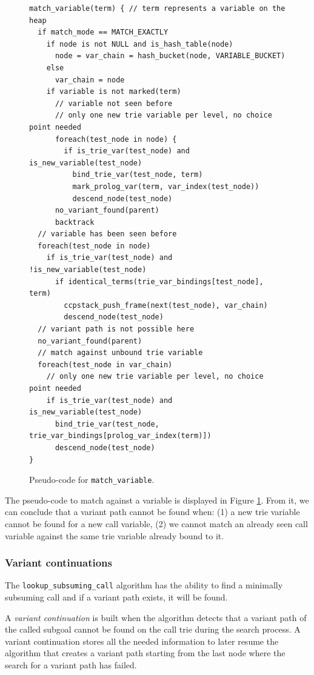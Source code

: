 \begin{figure}[ht]
\begin{Verbatim}[fontsize=\small]
match_variable(term) { // term represents a variable on the heap
  if match_mode == MATCH_EXACTLY
    if node is not NULL and is_hash_table(node)
      node = var_chain = hash_bucket(node, VARIABLE_BUCKET)
    else
      var_chain = node
    if variable is not marked(term)
      // variable not seen before
      // only one new trie variable per level, no choice point needed
      foreach(test_node in node) {
        if is_trie_var(test_node) and is_new_variable(test_node)
          bind_trie_var(test_node, term)
          mark_prolog_var(term, var_index(test_node))
          descend_node(test_node)
      no_variant_found(parent)
      backtrack
  // variable has been seen before
  foreach(test_node in node)
    if is_trie_var(test_node) and !is_new_variable(test_node)
      if identical_terms(trie_var_bindings[test_node], term)
        ccpstack_push_frame(next(test_node), var_chain)
        descend_node(test_node)
  // variant path is not possible here
  no_variant_found(parent)
  // match against unbound trie variable
  foreach(test_node in var_chain)
    // only one new trie variable per level, no choice point needed
    if is_trie_var(test_node) and is_new_variable(test_node)
      bind_trie_var(test_node, trie_var_bindings[prolog_var_index(term)])
      descend_node(test_node)
}
\end{Verbatim}
\caption{Pseudo-code for \texttt{match\_variable}.}
\label{fig:match_variable}
\end{figure}

The pseudo-code to match against a variable is displayed in Figure
\ref{fig:match_variable}. From it, we can conclude that a variant path
cannot be found when: (1) a new trie variable cannot be found
for a new call variable, (2) we cannot match an already seen
call variable against the same trie variable already bound to it.

\subsubsection{Variant continuations}

The \texttt{lookup\_subsuming\_call} algorithm has the ability to find a
minimally subsuming call and if a variant path exists, it will be found.

A \textit{variant continuation} is built when the algorithm detects that a variant path of the
called subgoal cannot be found on the call trie during the search process.
A variant continuation stores all the needed information to later resume
the algorithm that creates a variant path starting from the last node where the
search for a variant path has failed.


